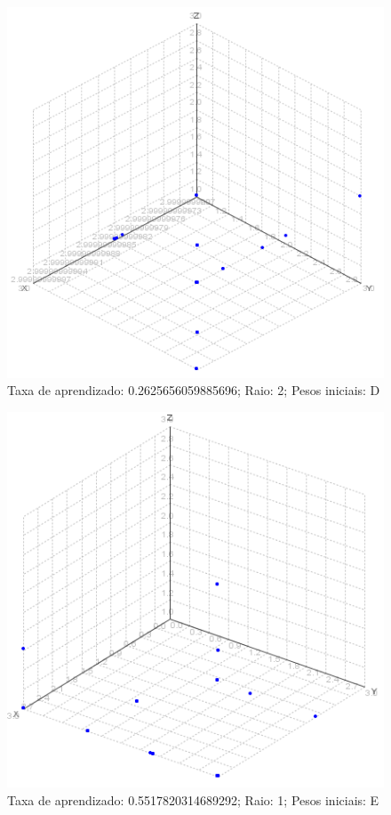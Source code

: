 \begin{figure}[ht!]
	\centering
	\includegraphics[scale=0.4]{./imgs/2d2.png}
	\caption{Taxa de aprendizado: 0.2625656059885696; Raio: 2; Pesos iniciais: D}
\end{figure}

\begin{figure}[ht!]
	\centering
	\includegraphics[scale=0.4]{./imgs/2e1.png}
	\caption{Taxa de aprendizado: 0.5517820314689292; Raio: 1; Pesos iniciais: E}
\end{figure}

